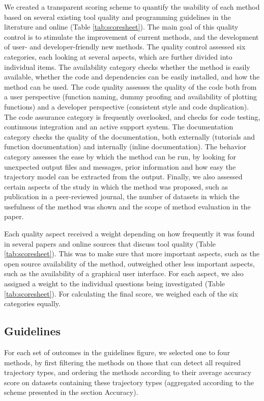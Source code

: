 We created a transparent scoring scheme to quantify the usability of each method based on several existing tool quality and programming guidelines in the literature and online (Table \ref{tab:scoresheet}). The main goal of this quality control is to stimulate the improvement of current methods, and the development of user- and developer-friendly new methods. The quality control assessed six categories, each looking at several aspects, which are further divided into individual items. The availability category checks whether the method is easily available, whether the code and dependencies can be easily installed, and how the method can be used. The code quality assesses the quality of the code both from a user perspective (function naming, dummy proofing and availability of plotting functions) and a developer perspective (consistent style and code duplication). The code assurance category is frequently overlooked, and checks for code testing, continuous integration \cite{beaulieu-jones_reproducibilitycomputationalworkflows_2017} and an active support system. The documentation category checks the quality of the documentation, both externally (tutorials and function documentation) and internally (inline documentation). The behavior category assesses the ease by which the method can be run, by looking for unexpected output files and messages, prior information and how easy the trajectory model can be extracted from the output. Finally, we also assessed certain aspects of the study in which the method was proposed, such as publication in a peer-reviewed journal, the number of datasets in which the usefulness of the method was shown and the scope of method evaluation in the paper.

Each quality aspect received a weight depending on how frequently it was found in several papers and online sources that discuss tool quality (Table \ref{tab:scoresheet}). This was to make sure that more important aspects, such as the open source availability of the method, outweighed other less important aspects, such as the availability of a graphical user interface. For each aspect, we also assigned a weight to the individual questions being investigated (Table \ref{tab:scoresheet}). For calculating the final score, we weighed each of the six categories equally.

\subsection{Guidelines}

For each set of outcomes in the guidelines figure, we selected one to four methods, by first filtering the methods on those that can detect all required trajectory types, and ordering the methods according to their average accuracy score on datasets containing these trajectory types (aggregated according to the scheme presented in the section Accuracy).

